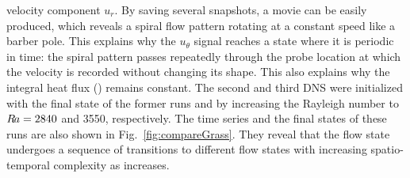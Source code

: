 \documentclass[a4paper, 11pt, DIV=11]{scrartcl}
\begin{document}
velocity component $u_r$. By saving several snapshots, a movie can be easily 
produced, which reveals a spiral flow pattern rotating at a constant speed 
like a barber pole. This explains why the $u_{\theta}$ signal reaches a state 
where it is periodic in time: the spiral pattern passes repeatedly through the 
probe location at which the velocity is recorded without changing its shape. 
This also explains why the integral heat flux (\Nui) remains constant. The 
second and third DNS were initialized with the final state of the former runs 
and by increasing the Rayleigh number to $R\hspace{-0.1em}a=\num{2840}$ and \num{3550},
respectively. The time series and the final states of these runs are also
shown in Fig.~\ref{fig:compareGrass}. They reveal that the flow state undergoes a
sequence of transitions to different flow states with increasing
spatio-temporal complexity as \Rayleigh increases.
\par
{}
\end{document}
